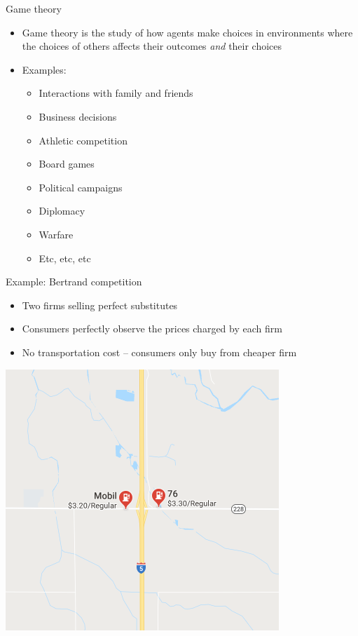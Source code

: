 \documentclass[10pt]{beamer}
\begin{document}
\begin{frame}[label={sec:org65c5b49}]{}
\alert{Game theory}
\begin{itemize}
\item Game theory is the study of how agents make choices in environments where the choices of others affects their outcomes \emph{and} their choices
\item Examples:
\begin{itemize}
\item Interactions with family and friends
\item Business decisions
\item Athletic competition
\item Board games
\item Political campaigns
\item Diplomacy
\item Warfare
\item Etc, etc, etc
\end{itemize}
\end{itemize}
\end{frame}

\begin{frame}[label={sec:org5aea281}]{}
\alert{Example: Bertrand competition}
\begin{itemize}
\item Two firms selling perfect substitutes
\item Consumers perfectly observe the prices charged by each firm
\item No transportation cost -- consumers only buy from cheaper firm
\end{itemize}
\end{frame}

\begin{frame}[label={sec:org1df1ff7}]{}
\begin{center}
\includegraphics[height=.5\textwidth]{./img/gas.png}
\end{center}
\end{frame}
\end{document}
